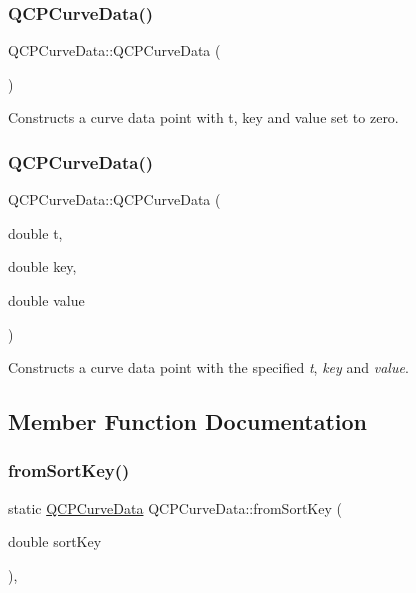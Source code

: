 \subsubsection{\texorpdfstring{QCPCurveData()}{QCPCurveData()}\hspace{0.1cm}{\footnotesize\ttfamily [1/2]}}
{\footnotesize\ttfamily Q\+C\+P\+Curve\+Data\+::\+Q\+C\+P\+Curve\+Data (\begin{DoxyParamCaption}{ }\end{DoxyParamCaption})}

Constructs a curve data point with t, key and value set to zero. \mbox{\label{class_q_c_p_curve_data_a3586be0cc6f8db15bcdd0c0d03b0c173}} 
\subsubsection{\texorpdfstring{QCPCurveData()}{QCPCurveData()}\hspace{0.1cm}{\footnotesize\ttfamily [2/2]}}
{\footnotesize\ttfamily Q\+C\+P\+Curve\+Data\+::\+Q\+C\+P\+Curve\+Data (\begin{DoxyParamCaption}\item[{double}]{t,  }\item[{double}]{key,  }\item[{double}]{value }\end{DoxyParamCaption})}

Constructs a curve data point with the specified {\itshape t}, {\itshape key} and {\itshape value}. 

\subsection{Member Function Documentation}
\mbox{\label{class_q_c_p_curve_data_a40adf1a6ba93051c415a65298b49aa6e}} 
\subsubsection{\texorpdfstring{fromSortKey()}{fromSortKey()}}
{\footnotesize\ttfamily static \mbox{\hyperlink{class_q_c_p_curve_data}{Q\+C\+P\+Curve\+Data}} Q\+C\+P\+Curve\+Data\+::from\+Sort\+Key (\begin{DoxyParamCaption}\item[{double}]{sort\+Key }\end{DoxyParamCaption})\hspace{0.3cm}{\ttfamily [inline]}, {\ttfamily [static]}}


